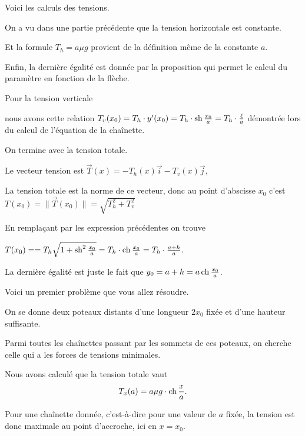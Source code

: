 \diapo


Voici les calculs des tensions.

\change

\change
On a vu dans une partie précédente que la tension horizontale est constante. 

\change
Et la formule $T_h = a \mu g$ provient de la définition même de la constante $a$.

\change
Enfin, la dernière égalité est donnée par la proposition qui permet le calcul du paramètre en fonction de la flèche.


\change
Pour la tension verticale 

\change
nous avons cette relation 
  $T_v(x_0) = T_h \cdot y'(x_0) =
  T_h \cdot \mathop{\mathrm{sh}}\nolimits \frac{x_0}{a} = T_h \cdot \frac \ell a$
  démontrée lors du calcul de l'équation de la chaînette.
  
\change
On termine avec la tension totale.

\change
Le vecteur tension est $\vec T(x) = -T_h(x)\vec i - T_v(x) \vec j$,

\change
La tension totale est la norme de ce vecteur, donc 
au point d'abscisse $x_0$ c'est $T(x_0) = \|\vec T(x_0) \| 
  = \sqrt{T_h^2+T_v^2}$
  
 \change
 En remplaçant par les expression précédentes on trouve
 
 $T(x_0) = = T_h \sqrt{1+\mathop{\mathrm{sh}}\nolimits^2 \frac{x_0}{a}}
  = T_h \cdot \mathop{\mathrm{ch}}\nolimits \frac{x_0}{a} = T_h \cdot \frac{a+h}{a}.$
  
  La dernière égalité est juste le fait que 
  $y_0 = a+h = a \mathop{\mathrm{ch}}\nolimits \frac{x_0}{a}$.



\diapo

Voici un premier problème que vous allez résoudre.

\change
On se donne deux poteaux distants d'une longueur $2x_0$ fixée 
et d'une hauteur suffisante.

\change
Parmi toutes les chaînettes passant par les sommets de ces poteaux, on cherche celle
qui a les forces de tensions minimales.

\change
Nous avons calculé que la tension totale vaut 
$$T_x(a) = a \mu g \cdot \mathop{\mathrm{ch}}\nolimits \frac{x}{a}.$$

\change
Pour une chaînette donnée, c'est-à-dire pour une valeur de $a$ fixée, 
la tension est donc maximale au point d'accroche, ici en $x=x_0$.

